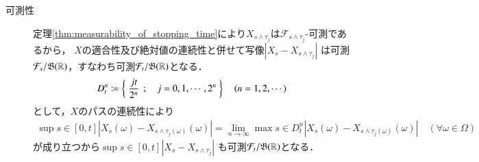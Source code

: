 \begin{prf}
\begin{description}
\begin{description}
					\item[可測性]
						定理\ref{thm:measurability_of_stopping_time}により$X_{s \wedge \tau_j}$は$\mathcal{F}_{s \wedge \tau_j}$-可測であるから，
						$X$の適合性及び絶対値の連続性と併せて写像$\left| X_s - X_{s \wedge \tau_j} \right|$
						は可測$\mathcal{F}_s/\mathfrak{B}(\mathbb{R})$，すなわち可測$\mathcal{F}_t/\mathfrak{B}(\mathbb{R})$となる．
						\begin{align}
							D_t^n \coloneqq \left\{\ \frac{jt}{2^n}\ \, ; \quad j=0,1,\cdots,2^n\ \right\}
							\quad (n=1,2,\cdots)
						\end{align}
						として，$X$のパスの連続性により
						\begin{align}
							\sup{s \in [0,t]}{\left| X_s(\omega) - X_{s \wedge \tau_j(\omega)}(\omega) \right|}
							= \lim_{n \to \infty} \max{s \in D_t^n}{\left| X_s(\omega) - X_{s \wedge \tau_j(\omega)}(\omega) \right|}
							\quad (\forall \omega \in \Omega)
						\end{align}
						が成り立つから$\sup{s \in [0,t]}{\left| X_s - X_{s \wedge \tau_j} \right|}$
						も可測$\mathcal{F}_t/\mathfrak{B}(\mathbb{R})$となる．
				\end{description}
				

\end{description}
\end{prf}
